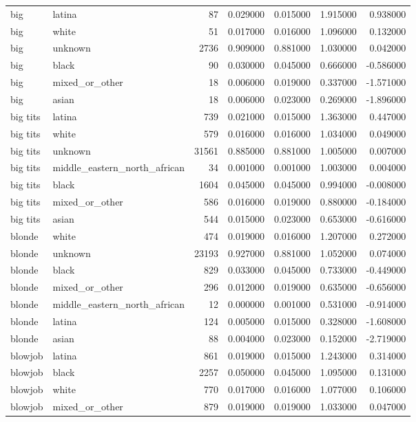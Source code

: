 \begin{tabular}{llrrrrr}
big & latina & 87 & 0.029000 & 0.015000 & 1.915000 & 0.938000 \\
big & white & 51 & 0.017000 & 0.016000 & 1.096000 & 0.132000 \\
big & unknown & 2736 & 0.909000 & 0.881000 & 1.030000 & 0.042000 \\
big & black & 90 & 0.030000 & 0.045000 & 0.666000 & -0.586000 \\
big & mixed_or_other & 18 & 0.006000 & 0.019000 & 0.337000 & -1.571000 \\
big & asian & 18 & 0.006000 & 0.023000 & 0.269000 & -1.896000 \\
big tits & latina & 739 & 0.021000 & 0.015000 & 1.363000 & 0.447000 \\
big tits & white & 579 & 0.016000 & 0.016000 & 1.034000 & 0.049000 \\
big tits & unknown & 31561 & 0.885000 & 0.881000 & 1.005000 & 0.007000 \\
big tits & middle_eastern_north_african & 34 & 0.001000 & 0.001000 & 1.003000 & 0.004000 \\
big tits & black & 1604 & 0.045000 & 0.045000 & 0.994000 & -0.008000 \\
big tits & mixed_or_other & 586 & 0.016000 & 0.019000 & 0.880000 & -0.184000 \\
big tits & asian & 544 & 0.015000 & 0.023000 & 0.653000 & -0.616000 \\
blonde & white & 474 & 0.019000 & 0.016000 & 1.207000 & 0.272000 \\
blonde & unknown & 23193 & 0.927000 & 0.881000 & 1.052000 & 0.074000 \\
blonde & black & 829 & 0.033000 & 0.045000 & 0.733000 & -0.449000 \\
blonde & mixed_or_other & 296 & 0.012000 & 0.019000 & 0.635000 & -0.656000 \\
blonde & middle_eastern_north_african & 12 & 0.000000 & 0.001000 & 0.531000 & -0.914000 \\
blonde & latina & 124 & 0.005000 & 0.015000 & 0.328000 & -1.608000 \\
blonde & asian & 88 & 0.004000 & 0.023000 & 0.152000 & -2.719000 \\
blowjob & latina & 861 & 0.019000 & 0.015000 & 1.243000 & 0.314000 \\
blowjob & black & 2257 & 0.050000 & 0.045000 & 1.095000 & 0.131000 \\
blowjob & white & 770 & 0.017000 & 0.016000 & 1.077000 & 0.106000 \\
blowjob & mixed_or_other & 879 & 0.019000 & 0.019000 & 1.033000 & 0.047000 \\

\end{tabular}
